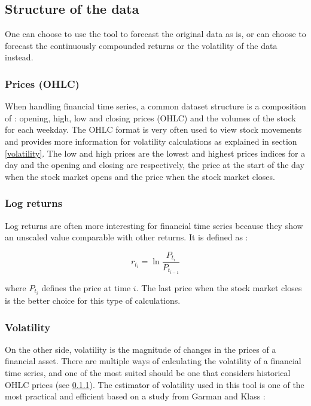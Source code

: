 \documentclass[11pt,a4paper,oneside]{book}
\begin{document}
\subsection{Structure of the data}

One can choose to use the tool to forecast the original data as is, or can choose to forecast the continuously compounded returns or the volatility of the data instead.


\subsubsection{Prices (OHLC)}\label{OHLC}

When handling financial time series, a common dataset structure is a composition of : opening, high, low and closing prices (OHLC) and the volumes of the stock for each weekday. The OHLC format is very often used to view stock movements and provides more information for volatility calculations as explained in section \ref{volatility}. The low and high prices are the lowest and highest prices indices for a day and the opening and closing are respectively, the price at the start of the day when the stock market opens and the price when the stock market closes.


\subsubsection{Log returns}

Log returns are often more interesting for financial time series because they show an unscaled value comparable with other returns. It is defined as :

\begin{equation}
r_{t_i} = \ln\frac{P_{t_i}}{P_{t_{i-1}}}
\end{equation}

where $P_{t_i}$ defines the price at time $i$. The last price when the stock market closes is the better choice for this type of calculations.


\subsubsection{Volatility}\label{vol}

On the other side, volatility is the magnitude of changes in the prices of a financial asset. There are multiple ways of calculating the volatility of a financial time series, and one of the most suited should be one that considers historical OHLC prices (see \ref{OHLC}). The estimator of volatility used in this tool is one of the most practical and efficient based on a study from Garman and Klass \cite{garm}:
\end{document}
